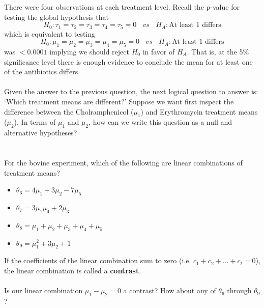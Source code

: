 There were four observations at each treatment level.  Recall the p-value for testing the global hypothesis that 
$$H_0: \tau_1=\tau_2=\tau_3=\tau_4=\tau_5=0~~~~vs~~~~H_A:\mbox{At least 1 differs}$$
which is equivalent to testing 
$$H_0: \mu_1=\mu_2=\mu_3=\mu_4=\mu_5=0~~~~vs~~~~H_A:\mbox{At least 1 differs}$$
was $<0.0001$ implying we should reject $H_0$ in favor of $H_A$.  That is, at the 5\% significance level there is enough evidence to conclude the mean for at least one of the antibiotics differs.\\~\\
Given the answer to the previous question, the next logical question to answer is: `Which treatment means are different?'  Suppose we want first inspect the difference between the Cholramphenicol ($\mu_{1}$) and Erythromycin treatment means ($\mu_{2}$).  In terms of $\mu_{1}$ and $\mu_{2}$, how can we write this question as a null and alternative hypotheses?\\
\\~\\
\color{black}
For the bovine experiment, which of the following are linear combinations of treatment means?
\begin{itemize}
    \item $\theta_6=4\mu_{1}+3\mu_{2}-7\mu_{5}$ %
    \item $\theta_7=3\mu_{1}\mu_{4}+2\mu_{3}$     %
    \item $\theta_8=\mu_{1}+\mu_{2}+\mu_{3}+\mu_{4}+\mu_{5}$  %
    \item $\theta_9=\mu_{1}^2+3\mu_{2}+1$   %
\end{itemize}
If the coefficients of the linear combination sum to zero (i.e. $c_1+c_2+...+c_t=0$), the linear combination is called a \textbf{contrast}.\\~\\
Is our linear combination $\mu_1-\mu_2=0$ a contrast?  How about any of $\theta_6$ through $\theta_9$?\\\\~\\~\\~\\~\\~\\
